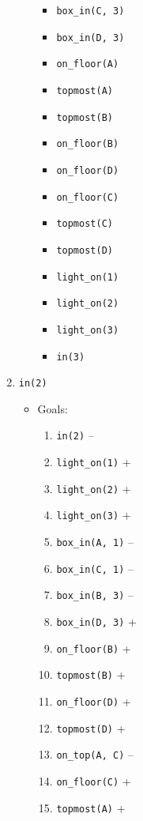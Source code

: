 \documentclass[12pt]{article}
\begin{document}
\begin{enumerate}
\begin{itemize}
\begin{itemize}
          \item \texttt{box\_in(C, 3)}
          \item \texttt{box\_in(D, 3)}
          \item \texttt{on\_floor(A)}
          \item \texttt{topmost(A)}
          \item \texttt{topmost(B)}
          \item \texttt{on\_floor(B)}
          \item \texttt{on\_floor(D)}
          \item \texttt{on\_floor(C)}
          \item \texttt{topmost(C)}
          \item \texttt{topmost(D)}
          \item \texttt{light\_on(1)}
          \item \texttt{light\_on(2)}
          \item \texttt{light\_on(3)}
          \item \texttt{in(3)}
        \end{itemize}
    \end{itemize}
  \item \texttt{in(2)}
    \begin{itemize}
      \item Goals:
        \begin{enumerate}
          \item \texttt{in(2)} --
          \item \texttt{light\_on(1)} +
          \item \texttt{light\_on(2)} +
          \item \texttt{light\_on(3)} +
          \item \texttt{box\_in(A, 1)} --
          \item \texttt{box\_in(C, 1)} --
          \item \texttt{box\_in(B, 3)} --
          \item \texttt{box\_in(D, 3)} +
          \item \texttt{on\_floor(B)} +
          \item \texttt{topmost(B)} +
          \item \texttt{on\_floor(D)} +
          \item \texttt{topmost(D)} +
          \item \texttt{on\_top(A, C)} --
          \item \texttt{on\_floor(C)} +
          \item \texttt{topmost(A)} +

\end{enumerate}
\end{itemize}
\end{enumerate}
\end{document}
